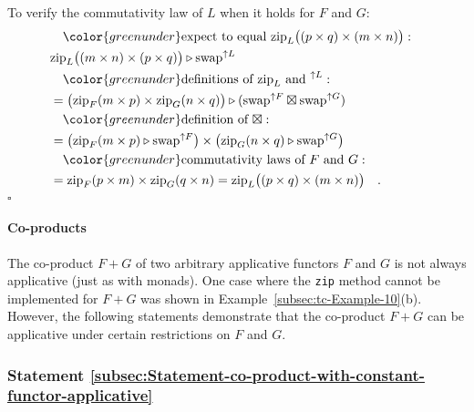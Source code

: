 To verify the commutativity law of $L$ when it holds for $F$ and
$G$:
\begin{align*}
 & \quad{\color{greenunder}\text{expect to equal }\text{zip}_{L}\big((p\times q)\times(m\times n)\big):}\quad\\
 & \text{zip}_{L}\big((m\times n)\times(p\times q)\big)\triangleright\text{swap}^{\uparrow L}\\
 & \quad{\color{greenunder}\text{definitions of }\text{zip}_{L}\text{ and }^{\uparrow L}:}\quad\\
 & =\big(\text{zip}_{F}(m\times p)\times\text{zip}_{G}(n\times q)\big)\triangleright(\text{swap}^{\uparrow F}\boxtimes\text{swap}^{\uparrow G})\\
 & \quad{\color{greenunder}\text{definition of }\boxtimes:}\quad\\
 & =\big(\text{zip}_{F}(m\times p)\triangleright\text{swap}^{\uparrow F}\big)\times\big(\text{zip}_{G}(n\times q)\triangleright\text{swap}^{\uparrow G}\big)\\
 & \quad{\color{greenunder}\text{commutativity laws of }F\text{ and }G:}\quad\\
 & =\text{zip}_{F}(p\times m)\times\text{zip}_{G}(q\times n)=\text{zip}_{L}\big((p\times q)\times(m\times n)\big)\quad.
\end{align*}
$\square$

\paragraph{Co-products}

The co-product $F+G$ of two arbitrary applicative functors $F$ and
$G$ is not always applicative (just as with monads). One case where
the \lstinline!zip! method cannot be implemented for $F+G$ was shown
in Example~\ref{subsec:tc-Example-10}(b). However, the following
statements demonstrate that the co-product $F+G$ can be applicative
under certain restrictions on $F$ and $G$.

\subsubsection{Statement \label{subsec:Statement-co-product-with-constant-functor-applicative}\ref{subsec:Statement-co-product-with-constant-functor-applicative}}

